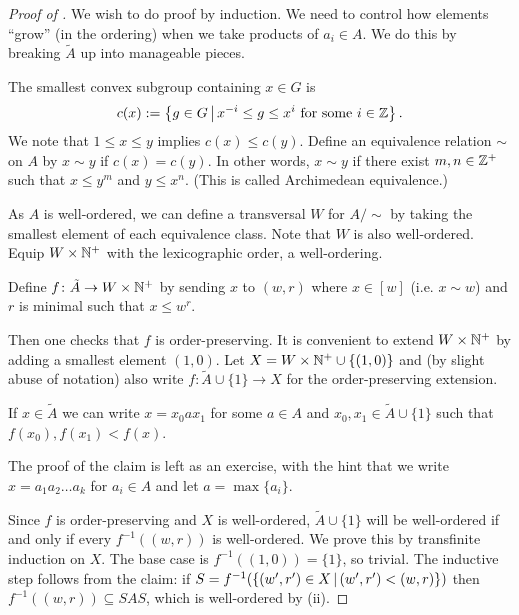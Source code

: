 \begin{proof}[Proof of ]
    We wish to do proof by induction.
    We need to control how elements ``grow'' (in the ordering) when we take products of $a_i \in A$.
    We do this by breaking $\tilde{A}$ up into manageable pieces.

    The smallest convex subgroup containing $x \in G$ is \[
        c(x) := \left\{ g \in G \,\middle|\, x^{-i} \leq g \leq x^i \text{ for some } i \in \mathbb{Z} \right\}.
    \]
    We note that $1 \leq x \leq y$ implies $c(x) \leq c(y)$.
    Define an equivalence relation $\sim$ on $A$ by $x \sim y$ if $c(x) = c(y)$.
    In other words, $x \sim y$ if there exist $m, n \in \mathbb{Z}^+$ such that $x \leq y^m$ and $y \leq x^n$.
    (This is called Archimedean equivalence.)

    As $A$ is well-ordered, we can define a transversal $W$ for $A / {\sim}$ by taking the smallest element of each equivalence class.
    Note that $W$ is also well-ordered.
    Equip $W \times \mathbb{N}^+$ with the lexicographic order, a well-ordering.

    Define $f \colon \tilde{A} \to W \times \mathbb{N}^+$ by sending $x$ to $(w, r)$ where $x \in [w]$ (i.e. $x \sim w$) and $r$ is minimal such that $x \leq w^r$.

    Then one checks that $f$ is order-preserving.
    It is convenient to extend $W \times \mathbb{N}^+$ by adding a smallest element $(1, 0)$.
    Let $X = W \times \mathbb{N}^+ \cup \{ (1, 0) \}$ and (by slight abuse of notation) also write $f \colon \tilde{A} \cup \{1\} \to X$ for the order-preserving extension.

    \begin{claim}
        If $x \in \tilde{A}$ we can write $x = x_0 a x_1$ for some $a \in A$ and $x_0, x_1 \in \tilde{A} \cup \{1\}$ such that $f(x_0), f(x_1) < f(x)$.
    \end{claim}

    The proof of the claim is left as an exercise, with the hint that we write $x = a_1 a_2 \dots a_k$ for $a_i \in A$ and let $a = \max \{a_i\}$.

    Since $f$ is order-preserving and $X$ is well-ordered, $\tilde{A} \cup \{1\}$ will be well-ordered if and only if every $f^{-1}((w,r))$ is well-ordered.
    We prove this by transfinite induction on $X$.
    The base case is $f^{-1}((1, 0)) = \{1\}$, so trivial.
    The inductive step follows from the claim: if $S = f^{-1} (\left\{ (w', r') \in X \,\middle|\, (w', r') < (w, r) \right\})$ then $f^{-1}((w, r)) \subseteq SAS$, which is well-ordered by  (ii).
\end{proof}
